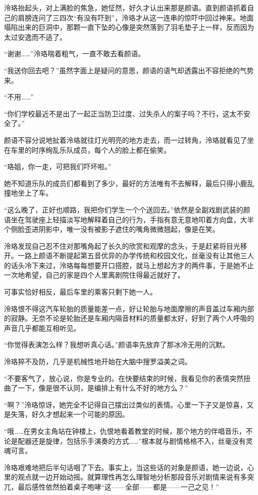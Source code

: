\documentclass[UTF8, scheme = chinese, openany]{ctexbook}
\begin{document}
泠珞抬起头，对上满脸的焦急，她怔然，好久才认出来那是颜语。直到颜语抓着自己的肩膀连问了三四次“有没有吓到”，泠珞才从这一连串的惊吓中回过神来。地面塌陷出来的巨洞中，那颗一直下坠的心像是突然落到了羽毛垫子上一样，反而因为太过安逸而不适了。

“谢谢……”泠珞喘着粗气，一直不敢去看颜语。

“我送你回去吧？”虽然字面上是疑问的意思，颜语的语气却透露出不容拒绝的气势来。

“不用……”

“你们学校最近不是出了一起正当防卫过度、过失杀人的案子吗？不行，这太不安全了。”

颜语不容分说地扯着泠珞就往灯光明亮的地方走去，而一过转角，泠珞就看见了坐在车里的时序绚乱乐队成员，每个人的脸上都在偷笑。

“珞姐，你一走，可把我们吓坏啦。”

她不知道乐队的成员们都看到了多少，最好的方法唯有不去解释，最后只得小鹿乱撞地坐上了车。

“这么晚了，正好也顺路，我把你们学生一个个送回去。”依然是全副戏剧武装的颜语坐在驾驶座上轻描淡写地解释着自己的行为，手指有意无意地叩着方向盘，大半个侧脸歪进阴影中，唯一没有被影子遮住的嘴角微微翘起，像是在笑。

泠珞发现自己忍不住对那嘴角起了长久的欣赏和观摩的念头，于是赶紧将目光移开。一路上颜语不断提起第五音优异的办学传统和校园文化，丝毫没有让其他三人的话头冷下来过，泠珞每每想要开口搭腔，就马上想起方才的两件事，于是她不止一次地希望，自己的家是四个人里离剧院住得最近就好了。

可事实恰好相反，最后车里的乘客只剩下她一人。

泠珞恨不得这汽车轮胎的质量能差一点，好让轮胎与地面摩擦的声音盖过车厢内部的寂静。无奈不论是轮胎还是车厢内隔音材料的质量都太好，好到了两个人呼吸的声音几乎都能互相听见。

“你觉得表演怎么样？我想听真心话。”颜语率先放弃了那冰冷无用的沉默。

泠珞猝不及防，几乎是机械性地开始在大脑中搜罗溢美之词。

“不要客气了，放心说，你是专业的。在快要结束的时候，我看见你的表情突然扭曲了一下，像是很不认同，是编排上有什么不好的地方么？”

“啊？”泠珞惊讶，她完全不记得自己摆出过类似的表情。心里一下子又是惊喜，又是失落，好久才想起来一个可能的原因。

“哦……在男女主角站在钟楼上，仇恨地看着教堂的时候，那个地方的伴唱音乐，不论是配器还是旋律，包括乐手演奏的方式……”根本就与剧情格格不入，丝毫没有灵魂可言。

泠珞艰难地把后半句话咽了下去。事实上，当这些话的对象是颜语，她一边说，心里的观点就一边开始动摇。就算理性再怎么理智地分析那段音乐对剧情来说有多突兀，最后感性依然拍着桌子咆哮“这——全部——都是——一己之见！”
\end{document}
